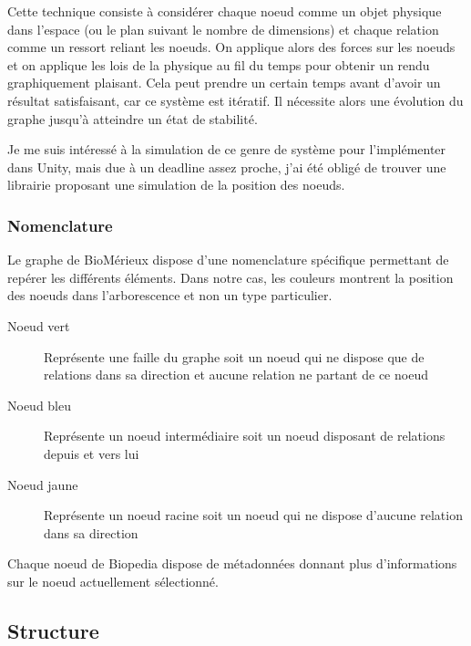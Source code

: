 Cette technique consiste à considérer chaque noeud comme un objet physique dans l'espace (ou le plan suivant le nombre de dimensions) et chaque relation comme un ressort reliant les noeuds.
On applique alors des forces sur les noeuds et on applique les lois de la physique au fil du temps pour obtenir un rendu graphiquement plaisant.
Cela peut prendre un certain temps avant d'avoir un résultat satisfaisant, car ce système est itératif.
Il nécessite alors une évolution du graphe jusqu'à atteindre un état de stabilité.

Je me suis intéressé à la simulation de ce genre de système pour l'implémenter dans Unity, mais due à un deadline assez proche, j'ai été obligé de trouver une librairie proposant une simulation de la position des noeuds.

\subsubsection{Nomenclature}
\label{biomerieuxBiopediaNomenclature}

Le graphe de BioMérieux dispose d'une nomenclature spécifique permettant de repérer les différents éléments.
Dans notre cas, les couleurs montrent la position des noeuds dans l'arborescence et non un type particulier.

\begin{description}
    \item[Noeud vert] Représente une faille du graphe soit un noeud qui ne dispose que de relations dans sa direction et aucune relation ne partant de ce noeud
    \item[Noeud bleu] Représente un noeud intermédiaire soit un noeud disposant de relations depuis et vers lui
    \item[Noeud jaune] Représente un noeud racine soit un noeud qui ne dispose d'aucune relation dans sa direction
\end{description}

Chaque noeud de Biopedia dispose de métadonnées donnant plus d'informations sur le noeud actuellement sélectionné.

\subsection{Structure}
\label{biomerieuxBiopediaStructure}

